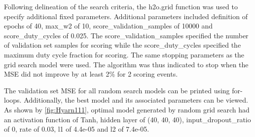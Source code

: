 \documentclass[12pt,twoside]{amherstthesis}
\begin{document}
  Following delineation of the search criteria, the h2o.grid function was
  used to specify additional fixed parameters. Additional parameters
  included definition of epochs of 40, max\_w2 of 10,
  score\_validation\_samples of 10000 and score\_duty\_cycles of 0.025.
  The score\_validation\_samples specified the number of validation set
  samples for scoring while the score\_duty\_cycles specified the maximum
  duty cycle fraction for scoring. The same stopping parameters as the
  grid search model were used. The algorithm was thus indicated to stop
  when the MSE did not improve by at least 2\% for 2 scoring events.
  
  \begin{Shaded}
  \begin{Highlighting}[]
  \StringTok{ }\NormalTok{(}
    \NormalTok{,}
     \NormalTok{,}
    \NormalTok{,}
    \NormalTok{,}
    \NormalTok{,}
    \NormalTok{,        }
    \NormalTok{,}
    \NormalTok{, }
    \NormalTok{,         }
    \NormalTok{,                      }
     
     
  \NormalTok{)}
  \end{Highlighting}
  \end{Shaded}
  
  The validation set MSE for all random search models can be printed using
  for-loops. Additionally, the best model and its associated parameters
  can be viewed. As shown by \autoref{fig:Hyarn111}, optimal model
  generated by random grid search had an activation function of Tanh,
  hidden layer of (40, 40, 40), input\_dropout\_ratio of 0, rate of 0.03,
  l1 of 4.4e-05 and l2 of 7.4e-05.
  
\end{document}
